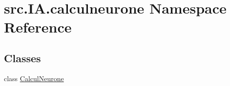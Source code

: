 \hypertarget{namespacesrc_1_1_i_a_1_1calculneurone}{}\section{src.\+I\+A.\+calculneurone Namespace Reference}
\label{namespacesrc_1_1_i_a_1_1calculneurone}
\subsection*{Classes}
\begin{DoxyCompactItemize}
\item 
class \hyperlink{classsrc_1_1_i_a_1_1calculneurone_1_1_calcul_neurone}{Calcul\+Neurone}
\end{DoxyCompactItemize}

